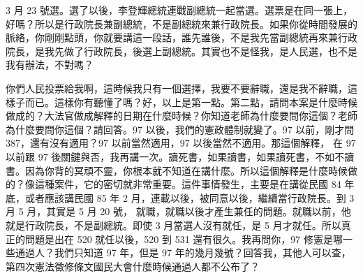 \hypertarget{c08:cue:63}{}3 月 23 號選。選了以後，李登輝總統連戰副總統一起當選。選票是在同一張上，好嗎？所以是行政院長兼副總統，不是副總統來兼行政院長。如果你從時間發展的脈絡，你剛剛點頭，你就要講這一段話，誰先誰後，不是我先當副總統再來兼行政院長，是我先做了行政院長，後選上副總統。其實也不是怪我，是人民選，也不是我有辦法，不對嗎？

\hypertarget{c08:cue:64}{}你們人民投票給我啊，這時候我只有一個選擇，我要不要辭職，還是我不辭職，這樣子而已。這樣你有聽懂了嗎？好，以上是第一點。第二點，請問本案是什麼時候做成的？大法官做成解釋的日期在什麼時候？你知道老師為什麼要問你這個？老師為什麼要問你這個？請回答。97 以後，我們的憲政體制就變了。97 以前，剛才問 387，還有沒有適用？97 以前當然適用，97 以後當然不適用。那這個解釋，
\hypertarget{c08:cue:65}{}在 97 以前跟 97 後關鍵與否，我再講一次。讀死書，如果讀書，如果讀死書，不如不讀書。因為你背的冥頑不靈，你根本就不知道在講什麼。所以這個解釋是什麼時候做的？像這種案件，它的密切就非常重要。這件事情發生，主要是在講從民國 84 年底，或者應該講民國 85 年 2 月，連載以後，被同意以後，繼續當行政院長。到 3 月 5 月，其實是 5 月 20 號，
\hypertarget{c08:cue:66}{}就職，就職以後才產生兼任的問題。就職以前，他就是行政院長，不是副總統。即使 3 月當選人沒有就任，是 5 月才就任。所以真正的問題是出在 520 就任以後，520 到 531 還有很久。我再問你，97 修憲是哪一些通過人？我們只知道 97 年，但是 97 年的幾月幾號？回答我，其他人可以查，第四次憲法徵修條文國民大會什麼時候通過人都不公布了？

